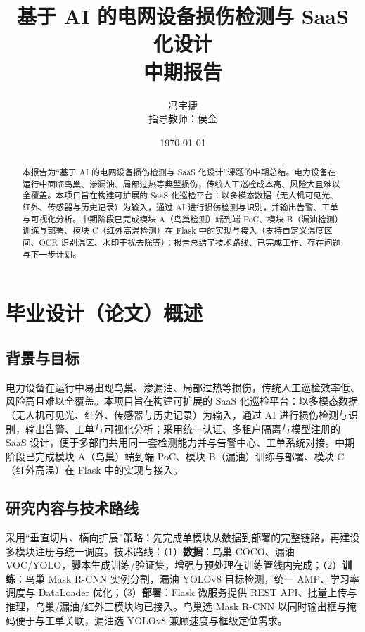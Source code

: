 \documentclass[12pt,a4paper]{article}
\title{基于 AI 的电网设备损伤检测与 SaaS 化设计\\中期报告}
\author{冯宇捷\\指导教师：侯金}
\date{\today}
\begin{document}
\maketitle

\begin{abstract}
本报告为“基于 AI 的电网设备损伤检测与 SaaS 化设计”课题的中期总结。电力设备在运行中面临鸟巢、渗漏油、局部过热等典型损伤，传统人工巡检成本高、风险大且难以全覆盖。本项目旨在构建可扩展的 SaaS 化巡检平台：以多模态数据（无人机可见光、红外、传感器与历史记录）为输入，通过 AI 进行损伤检测与识别，并输出告警、工单与可视化分析。中期阶段已完成模块 A（鸟巢检测）端到端 PoC、模块 B（漏油检测）训练与部署、模块 C（红外高温检测）在 Flask 中的实现与接入（支持自定义温度区间、OCR 识别温区、水印干扰去除等）；报告总结了技术路线、已完成工作、存在问题与下一步计划。
\end{abstract}

\tableofcontents
\newpage

\section{毕业设计（论文）概述}

\subsection{背景与目标}

电力设备在运行中易出现鸟巢、渗漏油、局部过热等损伤，传统人工巡检效率低、风险高且难以全覆盖。本项目旨在构建可扩展的 SaaS 化巡检平台：以多模态数据（无人机可见光、红外、传感器与历史记录）为输入，通过 AI 进行损伤检测与识别，输出告警、工单与可视化分析；采用统一认证、多租户隔离与模型注册的 SaaS 设计，便于多部门共用同一套检测能力并与告警中心、工单系统对接。中期阶段已完成模块 A（鸟巢）端到端 PoC、模块 B（漏油）训练与部署、模块 C（红外高温）在 Flask 中的实现与接入。

\subsection{研究内容与技术路线}

采用“垂直切片、横向扩展”策略：先完成单模块从数据到部署的完整链路，再建设多模块注册与统一调度。技术路线：（1）\textbf{数据}：鸟巢 COCO、漏油 VOC/YOLO，脚本生成训练/验证集，增强与预处理在训练管线内完成；（2）\textbf{训练}：鸟巢 Mask R-CNN 实例分割，漏油 YOLOv8 目标检测，统一 AMP、学习率调度与 DataLoader 优化；（3）\textbf{部署}：Flask 微服务提供 REST API、批量上传与推理，鸟巢/漏油/红外三模块均已接入。鸟巢选 Mask R-CNN 以同时输出框与掩码便于与工单关联，漏油选 YOLOv8 兼顾速度与框级定位需求。
\end{document}

